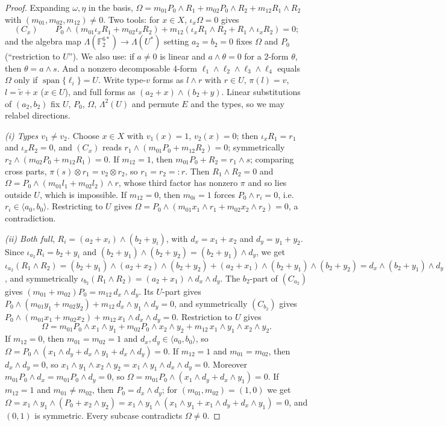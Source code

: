 \documentclass[11pt,a4paper]{article}
\theoremstyle{plain}
\theoremstyle{definition}
\theoremstyle{remark}
\newcommand{\F}{\mathbb{F}_2}
\newcommand{\Span}{\operatorname{span}}
\newcommand{\Lam}{\Lambda^{2}}
\begin{document}
\begin{proof}
Expanding $\omega,\eta$ in the basis, $\Omega=m_{01}P_0\wedge R_1+m_{02}P_0\wedge R_2+m_{12}R_1\wedge R_2$ with $(m_{01},m_{02},m_{12})\neq0$. Two tools: for $x\in X$, $\iota_x\Omega=0$ gives
\[
(C_x)\qquad P_0\wedge(m_{01}\iota_xR_1+m_{02}\iota_xR_2)+m_{12}(\iota_xR_1\wedge R_2+R_1\wedge\iota_xR_2)=0;
\]
and the algebra map $\Lambda(\F^{6*})\to\Lambda(U^*)$ setting $a_2=b_2=0$ fixes $\Omega$ and $P_0$ (``restriction to $U$''). We also use: if $a\neq0$ is linear and $a\wedge\theta=0$ for a 2-form $\theta$, then $\theta=a\wedge s$. And a nonzero decomposable 4-form $\ell_1\wedge\ell_2\wedge\ell_3\wedge\ell_4$ equals $\Omega$ only if $\Span\{\ell_i\}=U$. Write type-$v$ forms as $l\wedge r$ with $r\in U$, $\pi(l)=v$, $l=\tilde v+x$ ($x\in U$), and full forms as $(a_2+x)\wedge(b_2+y)$. Linear substitutions of $(a_2,b_2)$ fix $U$, $P_0$, $\Omega$, $\Lam(U)$ and permute $E$ and the types, so we may relabel directions.

\emph{(i) Types $v_1\neq v_2$.} Choose $x\in X$ with $v_1(x)=1$, $v_2(x)=0$; then $\iota_xR_1=r_1$ and $\iota_xR_2=0$, and $(C_x)$ reads $r_1\wedge(m_{01}P_0+m_{12}R_2)=0$; symmetrically $r_2\wedge(m_{02}P_0+m_{12}R_1)=0$.
If $m_{12}=1$, then $m_{01}P_0+R_2=r_1\wedge s$; comparing cross parts, $\pi(s)\otimes r_1=v_2\otimes r_2$, so $r_1=r_2=:r$. Then $R_1\wedge R_2=0$ and $\Omega=P_0\wedge(m_{01}l_1+m_{02}l_2)\wedge r$, whose third factor has nonzero $\pi$ and so lies outside $U$, which is impossible.
If $m_{12}=0$, then $m_{0i}=1$ forces $P_0\wedge r_i=0$, i.e.\ $r_i\in\langle a_0,b_0\rangle$. Restricting to $U$ gives $\Omega=P_0\wedge(m_{01}x_1\wedge r_1+m_{02}x_2\wedge r_2)=0$, a contradiction.

\emph{(ii) Both full}, $R_i=(a_2+x_i)\wedge(b_2+y_i)$, with $d_x=x_1+x_2$ and $d_y=y_1+y_2$. Since $\iota_{a_2}R_i=b_2+y_i$ and $(b_2+y_1)\wedge(b_2+y_2)=(b_2+y_1)\wedge d_y$, we get $\iota_{a_2}(R_1\wedge R_2)=(b_2+y_1)\wedge(a_2+x_2)\wedge(b_2+y_2)+(a_2+x_1)\wedge(b_2+y_1)\wedge(b_2+y_2)=d_x\wedge(b_2+y_1)\wedge d_y$, and symmetrically $\iota_{b_2}(R_1\wedge R_2)=(a_2+x_1)\wedge d_x\wedge d_y$. The $b_2$-part of $(C_{a_2})$ gives $(m_{01}+m_{02})P_0=m_{12}\,d_x\wedge d_y$. Its $U$-part gives $P_0\wedge(m_{01}y_1+m_{02}y_2)+m_{12}\,d_x\wedge y_1\wedge d_y=0$, and symmetrically $(C_{b_2})$ gives $P_0\wedge(m_{01}x_1+m_{02}x_2)+m_{12}\,x_1\wedge d_x\wedge d_y=0$. Restriction to $U$ gives
\[
\Omega=m_{01}P_0\wedge x_1\wedge y_1+m_{02}P_0\wedge x_2\wedge y_2+m_{12}\,x_1\wedge y_1\wedge x_2\wedge y_2 .
\]
If $m_{12}=0$, then $m_{01}=m_{02}=1$ and $d_x,d_y\in\langle a_0,b_0\rangle$, so $\Omega=P_0\wedge(x_1\wedge d_y+d_x\wedge y_1+d_x\wedge d_y)=0$.
If $m_{12}=1$ and $m_{01}=m_{02}$, then $d_x\wedge d_y=0$, so $x_1\wedge y_1\wedge x_2\wedge y_2=x_1\wedge y_1\wedge d_x\wedge d_y=0$. Moreover $m_{01}P_0\wedge d_x=m_{01}P_0\wedge d_y=0$, so $\Omega=m_{01}P_0\wedge(x_1\wedge d_y+d_x\wedge y_1)=0$.
If $m_{12}=1$ and $m_{01}\neq m_{02}$, then $P_0=d_x\wedge d_y$; for $(m_{01},m_{02})=(1,0)$ we get $\Omega=x_1\wedge y_1\wedge(P_0+x_2\wedge y_2)=x_1\wedge y_1\wedge(x_1\wedge y_1+x_1\wedge d_y+d_x\wedge y_1)=0$, and $(0,1)$ is symmetric. Every subcase contradicts $\Omega\neq0$.


\end{proof}
\end{document}
